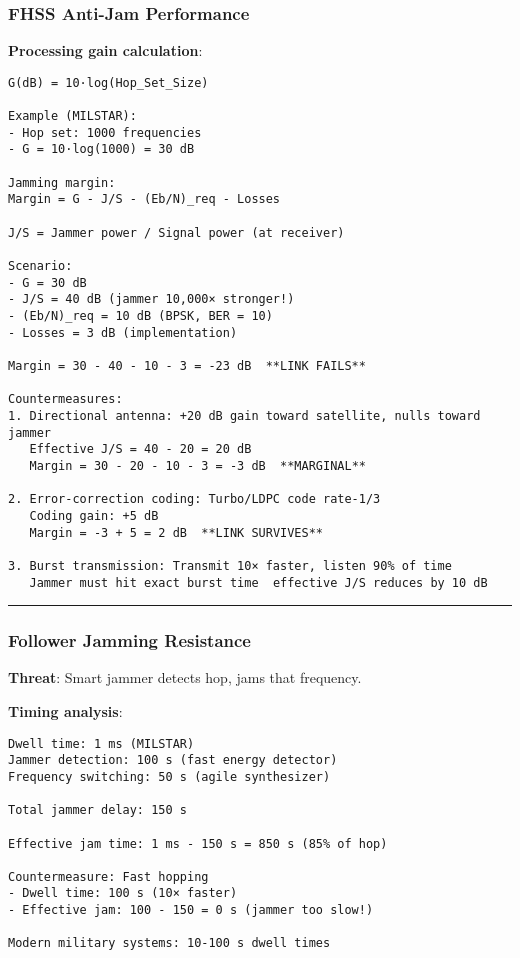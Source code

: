 \subsubsection{FHSS Anti-Jam
Performance}\label{fhss-anti-jam-performance}

\textbf{Processing gain calculation}:

\begin{verbatim}
G(dB) = 10·log(Hop_Set_Size)

Example (MILSTAR):
- Hop set: 1000 frequencies
- G = 10·log(1000) = 30 dB

Jamming margin:
Margin = G - J/S - (Eb/N)_req - Losses

J/S = Jammer power / Signal power (at receiver)

Scenario:
- G = 30 dB
- J/S = 40 dB (jammer 10,000× stronger!)
- (Eb/N)_req = 10 dB (BPSK, BER = 10)
- Losses = 3 dB (implementation)

Margin = 30 - 40 - 10 - 3 = -23 dB  **LINK FAILS**

Countermeasures:
1. Directional antenna: +20 dB gain toward satellite, nulls toward jammer
   Effective J/S = 40 - 20 = 20 dB
   Margin = 30 - 20 - 10 - 3 = -3 dB  **MARGINAL**

2. Error-correction coding: Turbo/LDPC code rate-1/3
   Coding gain: +5 dB
   Margin = -3 + 5 = 2 dB  **LINK SURVIVES**

3. Burst transmission: Transmit 10× faster, listen 90% of time
   Jammer must hit exact burst time  effective J/S reduces by 10 dB
\end{verbatim}

\begin{center}\rule{0.5\linewidth}{0.5pt}\end{center}

\subsubsection{Follower Jamming
Resistance}\label{follower-jamming-resistance}

\textbf{Threat}: Smart jammer detects hop, jams that frequency.

\textbf{Timing analysis}:

\begin{verbatim}
Dwell time: 1 ms (MILSTAR)
Jammer detection: 100 s (fast energy detector)
Frequency switching: 50 s (agile synthesizer)

Total jammer delay: 150 s

Effective jam time: 1 ms - 150 s = 850 s (85% of hop)

Countermeasure: Fast hopping
- Dwell time: 100 s (10× faster)
- Effective jam: 100 - 150 = 0 s (jammer too slow!)

Modern military systems: 10-100 s dwell times
\end{verbatim}

